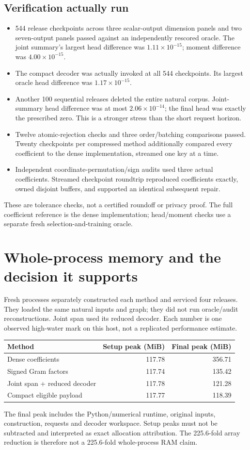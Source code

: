 \documentclass[11pt,a4paper]{article}
\begin{document}
\subsection*{Verification actually run}
\begin{itemize}
\item 544 release checkpoints across three scalar-output dimension panels
and two seven-output panels passed against an independently rescored oracle.
The joint summary's largest head difference was $1.11\times10^{-15}$; moment difference
was $4.00\times10^{-15}$.
\item The compact decoder was actually invoked at all 544 checkpoints. Its
largest oracle head difference was $1.17\times10^{-15}$.
\item Another 100 sequential releases deleted the entire natural corpus.
Joint-summary head difference was at most $2.06\times10^{-14}$; the final head was exactly
the prescribed zero. This is a stronger stress than the short request horizon.
\item Twelve atomic-rejection checks and three order/batching comparisons
passed. Twenty checkpoints per compressed method additionally compared every
coefficient to the dense implementation, streamed one key at a time.
\item Independent coordinate-permutation/sign audits used three actual
coefficients. Streamed checkpoint roundtrip reproduced coefficients exactly,
owned disjoint buffers, and supported an identical subsequent repair.
\end{itemize}
These are tolerance checks, not a certified roundoff or privacy proof. The
full coefficient reference is the dense implementation; head/moment checks
use a separate fresh selection-and-training oracle.

\newpage
\section*{Whole-process memory and the decision it supports}
Fresh processes separately constructed each method and serviced four releases.
They loaded the same natural inputs and graph; they did not run oracle/audit
reconstructions. Joint span used its reduced decoder. Each number is one
observed high-water mark on this host, not a replicated performance estimate.
\begin{center}\small
\begin{tabular}{lrr}\toprule
Method & Setup peak (MiB) & Final peak (MiB)\\\midrule
Dense coefficients & 117.78 & 356.71 \\
Signed Gram factors & 117.74 & 135.42 \\
Joint span + reduced decoder & 117.78 & 121.28 \\
Compact eligible payload & 117.77 & 118.39 \\
\bottomrule\end{tabular}\end{center}
The final peak includes the Python/numerical runtime, original inputs,
construction, requests and decoder workspace. Setup peaks must not be
subtracted and interpreted as exact allocation attribution. The 225.6-fold
array reduction is therefore not a 225.6-fold whole-process RAM claim.
\end{document}

